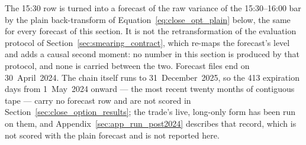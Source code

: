 The 15:30 row is turned into a forecast of the raw variance of the
15:30--16:00 bar by the plain back-transform of
Equation~\eqref{eq:close_opt_plain} below, the same for every forecast of this
section. It is not the retransformation of the evaluation protocol of
Section~\ref{sec:smearing_contract}, which re-maps the forecast's level and
adds a causal second moment: no number in this section is produced by that
protocol, and none is carried between the two.
Forecast files end on 30~April~2024. The chain itself runs to
31~December~2025, so the 413 expiration days from 1~May~2024
onward --- the most recent twenty months of contiguous tape --- carry no
forecast row and are not scored in Section~\ref{sec:close_option_results};
the trade's live, long-only form has been run on them, and
Appendix~\ref{sec:app_run_post2024} describes that record, which is not scored
with the plain forecast and is not reported here.

